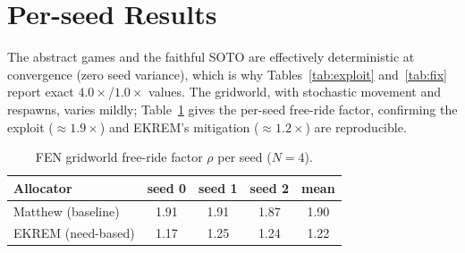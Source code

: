 \documentclass[conference, a4paper]{IEEEtran}
\begin{document}
\section{Per-seed Results}
The abstract games and the faithful SOTO are effectively deterministic at
convergence (zero seed variance), which is why Tables~\ref{tab:exploit}
and~\ref{tab:fix} report exact $4.0\times$/$1.0\times$ values. The gridworld, with
stochastic movement and respawns, varies mildly; Table~\ref{tab:perseed} gives
the per-seed free-ride factor, confirming the exploit ($\approx1.9\times$) and
EKREM's mitigation ($\approx1.2\times$) are reproducible.

\begin{table}[h]
\caption{FEN gridworld free-ride factor $\rho$ per seed ($N{=}4$).}
\label{tab:perseed}
\centering
\begin{tabular}{lcccc}
\toprule
Allocator & seed 0 & seed 1 & seed 2 & mean \\
\midrule
Matthew (baseline) & 1.91 & 1.91 & 1.87 & 1.90 \\
EKREM (need-based) & 1.17 & 1.25 & 1.24 & 1.22 \\
\bottomrule
\end{tabular}
\end{table}



\end{document}
